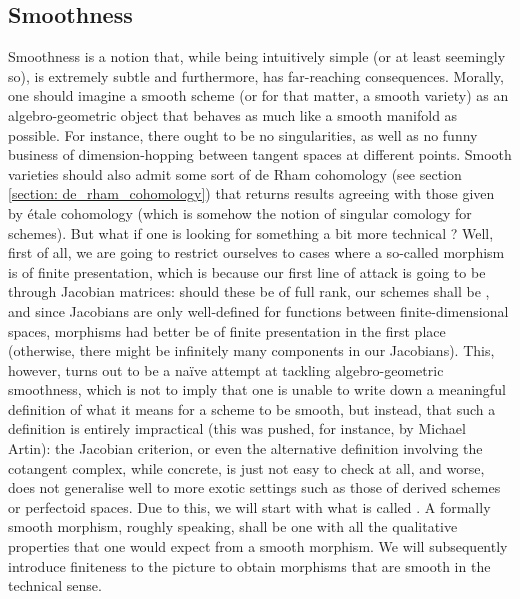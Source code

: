         \subsection{Smoothness}
            Smoothness is a notion that, while being intuitively simple (or at least seemingly so), is extremely subtle and furthermore, has far-reaching consequences. Morally, one should imagine a smooth scheme (or for that matter, a smooth variety) as an algebro-geometric object that behaves as much like a smooth manifold as possible. For instance, there ought to be no singularities, as well as no funny business of dimension-hopping between tangent spaces at different points. Smooth varieties should also admit some sort of de Rham cohomology (see section \ref{section: de_rham_cohomology}) that returns results agreeing with those given by \'etale cohomology (which is somehow the  notion of singular comology for schemes). But what if one is looking for something a bit more technical ? Well, first of all, we are going to restrict ourselves to cases where a so-called  morphism is of finite presentation, which is because our first line of attack is going to be through Jacobian matrices: should these be of full rank, our schemes shall be , and since Jacobians are only well-defined for functions between finite-dimensional spaces,  morphisms had better be of finite presentation in the first place (otherwise, there might be infinitely many components in our Jacobians). This, however, turns out to be a na\"ive attempt at tackling algebro-geometric smoothness, which is not to imply that one is unable to write down a meaningful definition of what it means for a scheme to be smooth, but instead, that such a definition is entirely impractical (this was pushed, for instance, by Michael Artin): the Jacobian criterion, or even the alternative definition involving the cotangent complex, while concrete, is just not easy to check at all, and worse, does not generalise well to more exotic settings such as those of derived schemes or perfectoid spaces. Due to this, we will start with what is called . A formally smooth morphism, roughly speaking, shall be one with all the qualitative properties that one would expect from a smooth morphism. We will subsequently introduce finiteness to the picture to obtain morphisms that are smooth in the technical sense. 
        
